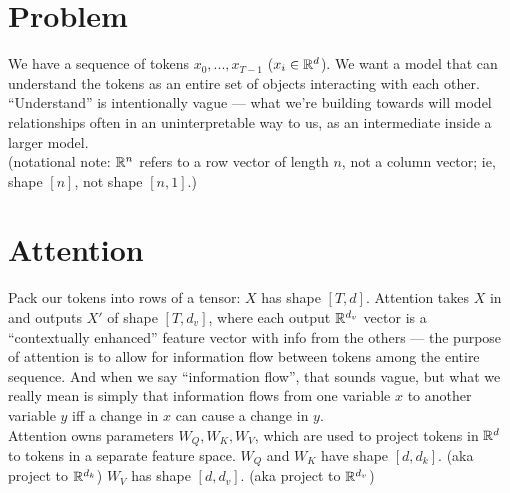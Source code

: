 \documentclass[12pt]{article}
\begin{document}
\pagebreak
\begin{outline}

\section{Problem}

We have a sequence of tokens $x_0,...,x_{T-1}$ ($x_i \in \mathbb{R}^d$). We want a model that can understand the tokens as an entire set of objects interacting with each other. ``Understand'' is intentionally vague --- what we're building towards will model relationships often in an uninterpretable way to us, as an intermediate inside a larger model. \\

(notational note: $\mathbb{R}^n$ refers to a row vector of length $n$, not a column vector; ie, shape $[n]$, not shape $[n,1]$.)

\section{Attention}

Pack our tokens into rows of a tensor: $X$ has shape $[T,d]$. Attention takes $X$ in and outputs $X'$ of shape $[T,d_v]$, where each output $\mathbb{R}^{d_v}$ vector is a ``contextually enhanced'' feature vector with info from the others --- the purpose of attention is to allow for information flow between tokens among the entire sequence. And when we say ``information flow'', that sounds vague, but what we really mean is simply that information flows from one variable $x$ to another variable $y$ iff a change in $x$ can cause a change in $y$. \\

Attention owns parameters $W_Q,W_K,W_V$, which are used to project tokens in $\mathbb{R}^d$ to tokens in a separate feature space.
\1 $W_Q$ and $W_K$ have shape $[d,d_k]$. (aka project to $\mathbb{R}^{d_k}$)
\1 $W_V$ has shape $[d,d_v]$. (aka project to $\mathbb{R}^{d_v}$)
\\\0


\end{outline}
\end{document}
